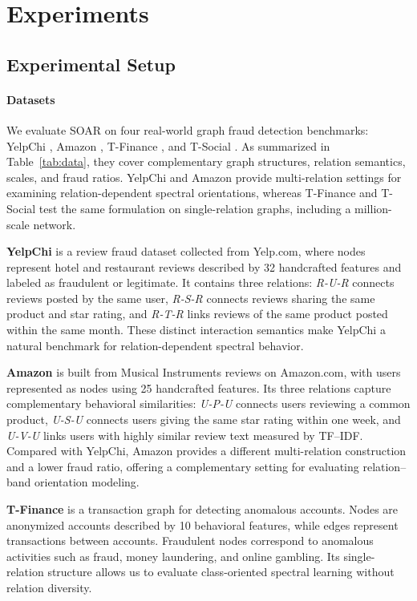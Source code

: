 \documentclass[10pt,journal]{IEEEtran}
\begin{document}
\section{Experiments}
\label{sec:experiments}
\subsection{Experimental Setup}
\label{sec:setup}
\paragraph{Datasets}
We evaluate SOAR on four real-world graph fraud detection benchmarks:
YelpChi \cite{rayana2015collective}, Amazon \cite{mcauley2013amateurs}, T-Finance \cite{tang2022bwgnn}, and T-Social \cite{tang2022bwgnn}.
As summarized in Table~\ref{tab:data}, they cover complementary graph
structures, relation semantics, scales, and fraud ratios. YelpChi and Amazon
provide multi-relation settings for examining relation-dependent spectral
orientations, whereas T-Finance and T-Social test the same formulation on
single-relation graphs, including a million-scale network.

\textbf{YelpChi} \cite{rayana2015collective} is a review fraud dataset collected from Yelp.com, where
nodes represent hotel and restaurant reviews described by 32 handcrafted
features and labeled as fraudulent or legitimate. It contains three relations:
\emph{R-U-R} connects reviews posted by the same user, \emph{R-S-R} connects
reviews sharing the same product and star rating, and \emph{R-T-R} links
reviews of the same product posted within the same month. These distinct
interaction semantics make YelpChi a natural benchmark for relation-dependent
spectral behavior.

\textbf{Amazon} \cite{mcauley2013amateurs} is built from Musical Instruments reviews on Amazon.com,
with users represented as nodes using 25 handcrafted features. Its three
relations capture complementary behavioral similarities: \emph{U-P-U}
connects users reviewing a common product, \emph{U-S-U} connects users
giving the same star rating within one week, and \emph{U-V-U} links users
with highly similar review text measured by TF--IDF. Compared with YelpChi,
Amazon provides a different multi-relation construction and a lower fraud
ratio, offering a complementary setting for evaluating relation--band
orientation modeling.

\textbf{T-Finance} \cite{tang2022bwgnn} is a transaction graph for detecting anomalous accounts.
Nodes are anonymized accounts described by 10 behavioral features, while
edges represent transactions between accounts. Fraudulent nodes correspond
to anomalous activities such as fraud, money laundering, and online gambling.
Its single-relation structure allows us to evaluate class-oriented spectral
learning without relation diversity.
\end{document}
